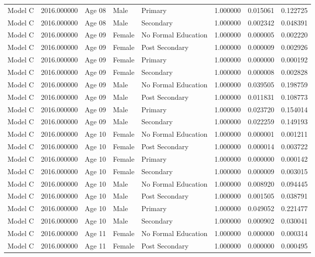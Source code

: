 \begin{table}[ht]
\begin{tabular}{lrlllrrr}
Model C & 2016.000000 & Age 08 & Male & Primary & 1.000000 & 0.015061 & 0.122725 \\
Model C & 2016.000000 & Age 08 & Male & Secondary & 1.000000 & 0.002342 & 0.048391 \\
Model C & 2016.000000 & Age 09 & Female & No Formal Education & 1.000000 & 0.000005 & 0.002220 \\
Model C & 2016.000000 & Age 09 & Female & Post Secondary & 1.000000 & 0.000009 & 0.002926 \\
Model C & 2016.000000 & Age 09 & Female & Primary & 1.000000 & 0.000000 & 0.000192 \\
Model C & 2016.000000 & Age 09 & Female & Secondary & 1.000000 & 0.000008 & 0.002828 \\
Model C & 2016.000000 & Age 09 & Male & No Formal Education & 1.000000 & 0.039505 & 0.198759 \\
Model C & 2016.000000 & Age 09 & Male & Post Secondary & 1.000000 & 0.011831 & 0.108773 \\
Model C & 2016.000000 & Age 09 & Male & Primary & 1.000000 & 0.023720 & 0.154014 \\
Model C & 2016.000000 & Age 09 & Male & Secondary & 1.000000 & 0.022259 & 0.149193 \\
Model C & 2016.000000 & Age 10 & Female & No Formal Education & 1.000000 & 0.000001 & 0.001211 \\
Model C & 2016.000000 & Age 10 & Female & Post Secondary & 1.000000 & 0.000014 & 0.003722 \\
Model C & 2016.000000 & Age 10 & Female & Primary & 1.000000 & 0.000000 & 0.000142 \\
Model C & 2016.000000 & Age 10 & Female & Secondary & 1.000000 & 0.000009 & 0.003015 \\
Model C & 2016.000000 & Age 10 & Male & No Formal Education & 1.000000 & 0.008920 & 0.094445 \\
Model C & 2016.000000 & Age 10 & Male & Post Secondary & 1.000000 & 0.001505 & 0.038791 \\
Model C & 2016.000000 & Age 10 & Male & Primary & 1.000000 & 0.049052 & 0.221477 \\
Model C & 2016.000000 & Age 10 & Male & Secondary & 1.000000 & 0.000902 & 0.030041 \\
Model C & 2016.000000 & Age 11 & Female & No Formal Education & 1.000000 & 0.000000 & 0.000314 \\
Model C & 2016.000000 & Age 11 & Female & Post Secondary & 1.000000 & 0.000000 & 0.000495 \\

\end{tabular}
\end{table}
